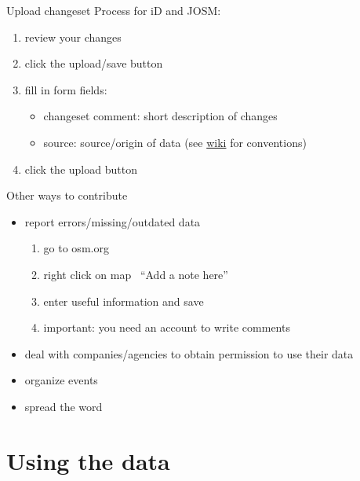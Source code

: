 \documentclass{beamer}
\begin{document}
			\begin{frame}{Upload changeset}
				Process for iD and JOSM:
				\begin{enumerate}
					\item review your changes\pause
					\item click the upload/save button\pause
					\item fill in form fields:
					\begin{itemize}
						\item changeset comment: short description of changes
						\item source: source/origin of data (see \href{https://wiki.openstreetmap.org/wiki/Key:source}{wiki} for conventions)
					\end{itemize}\pause
					\item click the upload button
				\end{enumerate}
			\end{frame}
			
			\begin{frame}{Other ways to contribute}
				\begin{itemize}
					\item report errors/missing/outdated data
					\begin{enumerate}
						\item go to osm.org
						\item right click on map \textrightarrow\ \enquote{Add a note here}
						\item enter useful information and save
						\item important: you need an account to write comments
					\end{enumerate}\pause
					\item deal with companies/agencies to obtain permission to use their data\pause
					\item organize events\pause
					\item spread the word
				\end{itemize}
			\end{frame}
	
	\section{Using the data}
	
		\begin{frame}
			\tableofcontents[currentsection]
		\end{frame}
		
\end{document}
